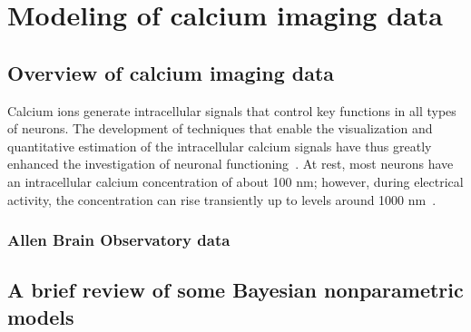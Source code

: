 \chapter{Modeling of calcium imaging data}

\fancyhead[RO,LE]{\thepage}

\setlength{\parskip}{0.5pt}

\bigskip

\section{Overview of calcium imaging data} 

Calcium ions generate intracellular signals that control key functions in all types of neurons.
The development of techniques that enable the visualization and quantitative estimation of the intracellular calcium signals have thus greatly enhanced the investigation of neuronal functioning~\citep{grienberger2012}.
At rest, most neurons have an intracellular calcium concentration of about 100 nm; however, during electrical activity, the concentration can rise transiently up to levels around 1000 nm~\citep{berridge2000}. 



\subsection{Allen Brain Observatory data}
\noindent

\section{A brief review of some Bayesian nonparametric models} 
\noindent

\noindent

